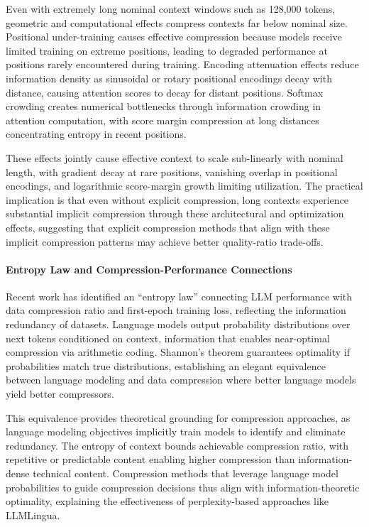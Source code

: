 Even with extremely long nominal context windows such as 128,000 tokens, geometric and computational effects compress contexts far below nominal size. Positional under-training causes effective compression because models receive limited training on extreme positions, leading to degraded performance at positions rarely encountered during training. Encoding attenuation effects reduce information density as sinusoidal or rotary positional encodings decay with distance, causing attention scores to decay for distant positions. Softmax crowding creates numerical bottlenecks through information crowding in attention computation, with score margin compression at long distances concentrating entropy in recent positions.

These effects jointly cause effective context to scale sub-linearly with nominal length, with gradient decay at rare positions, vanishing overlap in positional encodings, and logarithmic score-margin growth limiting utilization. The practical implication is that even without explicit compression, long contexts experience substantial implicit compression through these architectural and optimization effects, suggesting that explicit compression methods that align with these implicit compression patterns may achieve better quality-ratio trade-offs.

\paragraph{Entropy Law and Compression-Performance Connections}

Recent work has identified an ``entropy law'' connecting LLM performance with data compression ratio and first-epoch training loss, reflecting the information redundancy of datasets. Language models output probability distributions over next tokens conditioned on context, information that enables near-optimal compression via arithmetic coding. Shannon's theorem guarantees optimality if probabilities match true distributions, establishing an elegant equivalence between language modeling and data compression where better language models yield better compressors.

This equivalence provides theoretical grounding for compression approaches, as language modeling objectives implicitly train models to identify and eliminate redundancy. The entropy of context bounds achievable compression ratio, with repetitive or predictable content enabling higher compression than information-dense technical content. Compression methods that leverage language model probabilities to guide compression decisions thus align with information-theoretic optimality, explaining the effectiveness of perplexity-based approaches like LLMLingua.

